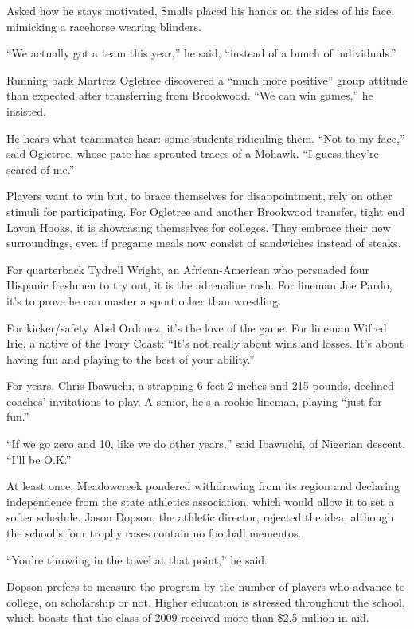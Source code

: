 ﻿\documentclass[12pt]{article}
\begin{document}
Asked how he stays motivated, Smalls placed his hands on the sides of his face, mimicking a
racehorse wearing blinders.

``We actually got a team this year,'' he said, ``instead of a bunch of individuals.''

Running back Martrez Ogletree discovered a ``much more positive'' group attitude than expected after
transferring from Brookwood. ``We can win games,'' he insisted.

He hears what teammates hear: some students ridiculing them. ``Not to my face,'' said Ogletree,
whose pate has sprouted traces of a Mohawk. ``I guess they're scared of me.''

Players want to win but, to brace themselves for disappointment, rely on other stimuli for
participating. For Ogletree and another Brookwood transfer, tight end Lavon Hooks, it is showcasing
themselves for colleges. They embrace their new surroundings, even if pregame meals now consist of
sandwiches instead of steaks.

For quarterback Tydrell Wright, an African-American who persuaded four Hispanic freshmen to try out,
it is the adrenaline rush. For lineman Joe Pardo, it's to prove he can master a sport other than
wrestling.

For kicker/safety Abel Ordonez, it's the love of the game. For lineman Wifred Irie, a native of the
Ivory Coast: ``It's not really about wins and losses. It's about having fun and playing to the best
of your ability.''

For years, Chris Ibawuchi, a strapping 6 feet 2 inches and 215 pounds, declined coaches' invitations
to play. A senior, he's a rookie lineman, playing ``just for fun.''

``If we go zero and 10, like we do other years,'' said Ibawuchi, of Nigerian descent, ``I'll be
O.K.''

At least once, Meadowcreek pondered withdrawing from its region and declaring independence from the
state athletics association, which would allow it to set a softer schedule. Jason Dopson, the
athletic director, rejected the idea, although the school's four trophy cases contain no football
mementos.

``You're throwing in the towel at that point,'' he said.

Dopson prefers to measure the program by the number of players who advance to college, on
scholarship or not. Higher education is stressed throughout the school, which boasts that the class
of 2009 received more than \$2.5 million in aid.
\end{document}
